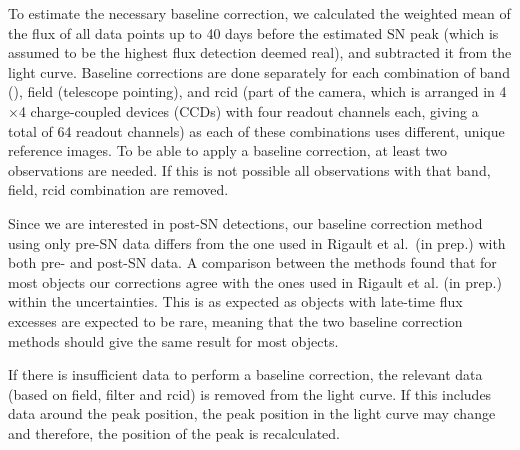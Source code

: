 \documentclass[a4paper,oneside,12pt, class=Latex/Classes/PhDthesisPSnPDF, crop=false]{standalone}
\begin{document}
To estimate the necessary baseline correction, we calculated the weighted mean of the flux of all data points up to 40 days before the estimated SN peak (which is assumed to be the highest flux detection deemed real), and subtracted it from the light curve. Baseline corrections are done separately for each combination of band (\ztfg\ztfr\ztfi), field (telescope pointing), and rcid (part of the camera, which is arranged in 4$\times$4 charge-coupled devices (CCDs) with four readout channels each, giving a total of 64 readout channels) as each of these combinations uses different, unique reference images. To be able to apply a baseline correction, at least two observations are needed. If this is not possible all observations with that band, field, rcid combination are removed.

Since we are interested in post-SN detections, our baseline correction method using only pre-SN data differs from the one used in Rigault et al.~(in prep.) with both pre- and post-SN data. A comparison between the methods found that for most objects our corrections agree with the ones used in Rigault et al. (in prep.) within the uncertainties. This is as expected as objects with late-time flux excesses are expected to be rare, meaning that the two baseline correction methods should give the same result for most objects. 

If there is insufficient data to perform a baseline correction, the relevant data (based on field, filter and rcid) is removed from the light curve. If this includes data around the peak position, the peak position in the light curve may change and therefore, the position of the peak is recalculated. 
\end{document}
